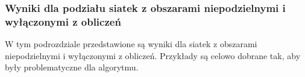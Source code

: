 \newpage

\subsubsection{Wyniki dla podziału siatek z obszarami niepodzielnymi i wyłączonymi z obliczeń}
W tym podrozdziale przedstawione są wyniki dla siatek z obszarami niepodzielnymi i wyłączonymi
z obliczeń.
Przykłady są celowo dobrane tak, aby były problematyczne dla algorytmu.


\begin{figure}[h]
\centering
\begin{subfigure}{.33\textwidth}
    \centering
    \caption[short]{}
\end{subfigure}%
\begin{subfigure}{.33\textwidth}
    \centering
    \caption[short]{}
\end{subfigure}%

\end{figure}
